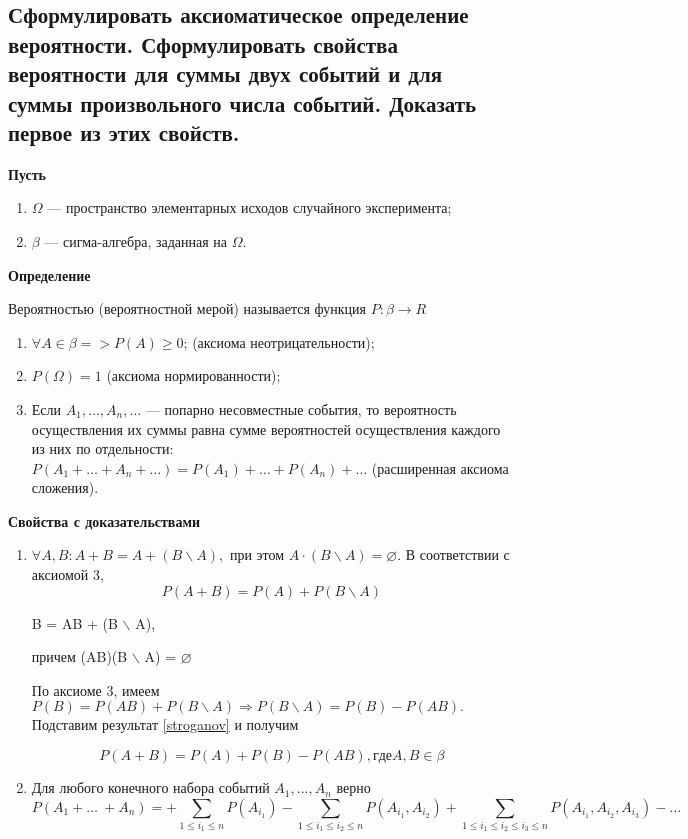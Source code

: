 \subsection{Сформулировать аксиоматическое определение вероятности. Сформулировать свойства вероятности для суммы двух событий и для суммы произвольного числа событий. Доказать первое из этих свойств.}

\textbf{Пусть} 

\begin{enumerate}
	\item $\Omega$ --- пространство элементарных исходов случайного эксперимента;
	\item $\beta$ --- сигма-алгебра, заданная на $\Omega$.
\end{enumerate}

\textbf{Определение}

Вероятностью (вероятностной мерой) называется функция $P: \beta \rightarrow R$

\begin{enumerate}
	\item $\forall A \in \beta => P(A) \geqslant 0$; (аксиома неотрицательности);
	\item $P(\Omega) = 1$ (аксиома нормированности);
	\item Если $A_1, \dots, A_n, \dots$ --- попарно несовместные события, то вероятность осуществления их суммы равна сумме вероятностей осуществления каждого из них по отдельности: $P(A_1 + \dots + A_n + \dots) = P(A_1) + \dots + P(A_n) + \dots$ (расширенная аксиома сложения). 
\end{enumerate}

\textbf{Свойства с доказательствами}

\begin{enumerate}

	\item $\forall A, B: A + B = A + (B \backslash A), $ 
	при этом $A \cdot (B \backslash A) = \varnothing.$
	В соответствии с аксиомой 3,
	\begin{equation}
		\label{stroganov}
		P(A + B) = P(A) + P(B \backslash A)
	\end{equation}
	
	B = AB + (B $\backslash$ A), 
	
	причем (AB)(B $\backslash$ A) = $\varnothing$
	
	По аксиоме 3, имеем $P(B) = P(AB) + P(B \backslash A) \Rightarrow P(B \backslash A) = P(B) - P(AB).$ Подставим результат \ref{stroganov} и получим
	
	\begin{equation}
		P(A + B) = P(A) + P(B) - P(AB), где A, B \in \beta
	\end{equation}
	\item Для любого конечного набора событий $A_1, \dots, A_n$ верно
	\begin{equation}
		P(A_1 + \dots\ + A_n) = + \sum\limits_{1 \leqslant i_1 \leqslant n}P(A_{i_1}) - \sum\limits_{1 \leqslant i_1 \leqslant i_2 \leqslant n}P(A_{i_1}, A_{i_2}) + \sum\limits_{1 \leqslant i_1 \leqslant i_2 \leqslant i_3 \leqslant n}P(A_{i_1}, A_{i_2}, A_{i_3}) - \dots
	\end{equation}
\end{enumerate}

